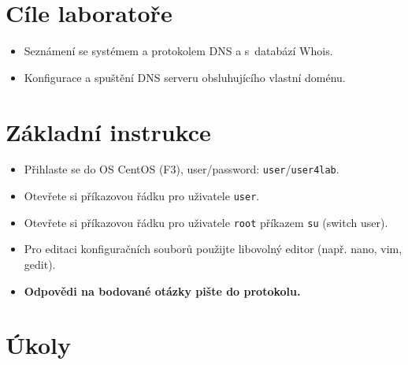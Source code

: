 
\section*{Cíle laboratoře}
\begin{itemize}
  \item Seznámení se systémem a protokolem DNS a s~databází Whois.
  \item Konfigurace a spuštění DNS serveru obsluhujícího vlastní doménu.
\end{itemize}

\section*{Základní instrukce}
\begin{itemize}
  \item Přihlaste se do OS CentOS (F3), user/password: {\tt user}/{\tt user4lab}.
  \item Otevřete si příkazovou řádku pro uživatele {\tt user}.
  \item Otevřete si příkazovou řádku pro uživatele {\tt root} příkazem {\tt su}
    (switch user).
  \item Pro editaci konfiguračních souborů použijte libovolný editor (např.
    nano, vim, gedit).
  \item {\bf Odpovědi na bodované otázky pište do protokolu.}
\end{itemize}

\section*{Úkoly}

